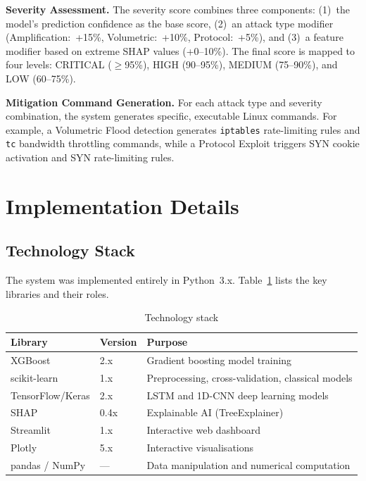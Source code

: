 \textbf{Severity Assessment.} The severity score combines three components: (1)~the model's prediction confidence as the base score, (2)~an attack type modifier (Amplification:~+15\%, Volumetric:~+10\%, Protocol:~+5\%), and (3)~a feature modifier based on extreme SHAP values (+0--10\%). The final score is mapped to four levels: CRITICAL ($\geq$95\%), HIGH (90--95\%), MEDIUM (75--90\%), and LOW (60--75\%).

\textbf{Mitigation Command Generation.} For each attack type and severity combination, the system generates specific, executable Linux commands. For example, a Volumetric Flood detection generates \texttt{iptables} rate-limiting rules and \texttt{tc} bandwidth throttling commands, while a Protocol Exploit triggers SYN cookie activation and SYN rate-limiting rules.

\section{Implementation Details}

\subsection{Technology Stack}

The system was implemented entirely in Python~3.x. Table~\ref{tab:tech_stack} lists the key libraries and their roles.

\begin{table}[htbp]
    \centering
    \caption{Technology stack}
    \label{tab:tech_stack}
    \begin{tabular}{lll}
        \toprule
        \textbf{Library} & \textbf{Version} & \textbf{Purpose} \\
        \midrule
        XGBoost           & 2.x   & Gradient boosting model training \\
        scikit-learn      & 1.x   & Preprocessing, cross-validation, classical models \\
        TensorFlow/Keras  & 2.x   & LSTM and 1D-CNN deep learning models \\
        SHAP              & 0.4x  & Explainable AI (TreeExplainer) \\
        Streamlit         & 1.x   & Interactive web dashboard \\
        Plotly            & 5.x   & Interactive visualisations \\
        pandas / NumPy    & ---   & Data manipulation and numerical computation \\
        \bottomrule
    \end{tabular}
\end{table}

